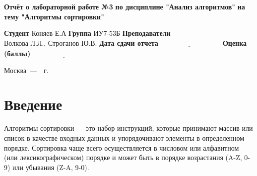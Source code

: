 \documentclass[a4paper,12pt]{report}
\begin{document}
\begin{titlepage}
		
		\begin{center}
			\noindent\begin{minipage}{1.3\textwidth}\centering
				\Large\textbf{  Отчёт о лабораторной работе №3}\newline
				\textbf{по дисциплине "Анализ алгоритмов"}\newline
				\textbf{на тему "Алгоритмы сортировки"}\newline\newline
			\end{minipage}
		\end{center}
		
		\noindent\textbf{Студент} $\underline{\text{Коняев Е.А}}$\newline\newline
		\noindent\textbf{Группа} $\underline{\text{ИУ7-53Б}}$\newline\newline
		\noindent\textbf{Преподаватели} $\underline{\text{Волкова Л.Л., Строганов Ю.В.}}$\newline\newline
		\noindent\textbf{Дата сдачи отчета}$\underline{\text{~~~~~~~~~~~~~~~~~~~~~~~~~~~}}$\newline\newline
		\noindent\textbf{Оценка (баллы)} $\underline{\text{~~~~~~~~~~~~~~~~~~~~~~~~~~~}}$\newline\newline\newline
		
		\begin{center}
			\vfill
			Москва~---~\the\year~г.
		\end{center}
	\end{titlepage}
	
	\setcounter{page}{2}
	\tableofcontents
	
	\newpage
	\chapter*{Введение}
	
	
	
Алгоритмы сортировки — это набор инструкций, которые принимают массив или список в качестве входных данных и упорядочивают элементы в определенном порядке. Сортировка чаще всего осуществляется в числовом или алфавитном (или лексикографическом) порядке и может быть в порядке возрастания (A-Z, 0-9) или убывания (Z-A, 9-0).
\end{document}
